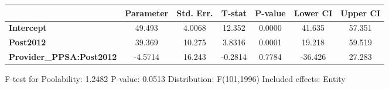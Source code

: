 \begin{center}
\begin{tabular}{lclc}
\bottomrule
\end{tabular}
\begin{tabular}{lcccccc}
                                 & \textbf{Parameter} & \textbf{Std. Err.} & \textbf{T-stat} & \textbf{P-value} & \textbf{Lower CI} & \textbf{Upper CI}  \\
\midrule
\textbf{Intercept}               &       49.493       &       4.0068       &      12.352     &      0.0000      &       41.635      &       57.351       \\
\textbf{Post2012}                &       39.369       &       10.275       &      3.8316     &      0.0001      &       19.218      &       59.519       \\
\textbf{Provider\_PPSA:Post2012} &      -4.5714       &       16.243       &     -0.2814     &      0.7784      &      -36.426      &       27.283       \\
\bottomrule
\end{tabular}
\end{center}

F-test for Poolability: 1.2482 \newline
 P-value: 0.0513 \newline
 Distribution: F(101,1996) \newline
  \newline
 Included effects: Entity